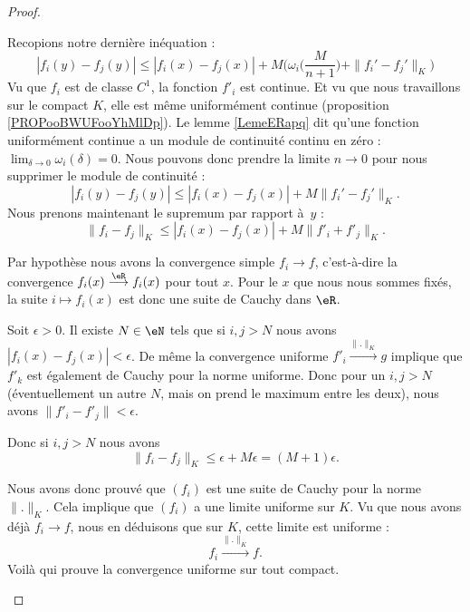 \begin{proof}
\begin{subproof}
		Recopions notre dernière inéquation :
		\begin{equation}
			| f_i(y) - f_j(y)| \leq | f_i(x)-f_j(x) |+M\Big( \omega_i\big( \frac{ M }{ n+1 } \big)+\| f_i'-f_j' \|_K \Big)
		\end{equation}
		Vu que \( f_i\) est de classe \( C^1\), la fonction \( f'_i\) est continue. Et vu que nous travaillons sur le compact \( K\), elle est même uniformément continue (proposition \ref{PROPooBWUFooYhMlDp}). Le lemme \ref{LemeERapq} dit qu'une fonction uniformément continue a un module de continuité continu en zéro : \( \lim_{\delta\to 0} \omega_i(\delta) = 0\). Nous pouvons donc prendre la limite \( n\to 0\) pour nous supprimer le module de continuité :
		\begin{equation}
			| f_i(y)-f_j(y) |\leq | f_i(x)-f_j(x) |+M\| f_i'-f_j' \|_K.
		\end{equation}
		Nous prenons maintenant le supremum par rapport à~\( y\) :
		\begin{equation}
			\|f_i-f_j\|_K \leq  \left| f_i(x) - f_j(x) \right| + M \|f'_i+f'_j\|_K.
		\end{equation}

		Par hypothèse nous avons la convergence simple \( f_i\to f\), c'est-à-dire la convergence \( f_i(x)\stackrel{\eR}{\longrightarrow}f_i(x)\) pour tout \( x\). Pour le \( x\) que nous nous sommes fixés, la suite \( i\mapsto f_i(x)\) est donc une suite de Cauchy dans \( \eR\).

		Soit \( \epsilon>0\). Il existe \( N\in \eN\) tels que si \( i,j>N\) nous avons \( | f_i(x)-f_j(x) |<\epsilon\). De même la convergence uniforme \( f'_i\stackrel{\| . \|_K}{\longrightarrow} g\) implique que \( f'_k\) est également de Cauchy pour la norme uniforme. Donc pour un \( i,j>N\) (éventuellement un autre \( N\), mais on prend le maximum entre les deux), nous avons \( \| f'_i-f'_j \|<\epsilon\).

		Donc si \( i,j>N\) nous avons
		\begin{equation}
			\|f_i-f_j\|_K \leq \epsilon + M \epsilon=(M+1)\epsilon.
		\end{equation}

		Nous avons donc prouvé que \( (f_i)\) est une suite de Cauchy pour la norme \( \| . \|_K \). Cela implique que \( (f_i)\) a une limite uniforme sur \( K\). Vu que nous avons déjà \( f_i\to f\), nous en déduisons que sur \( K\), cette limite est uniforme :
		\begin{equation}
			f_i\stackrel{\| . \|_K}{\longrightarrow}f.
		\end{equation}
		Voilà qui prouve la convergence uniforme sur tout compact.


\end{subproof}
\end{proof}
